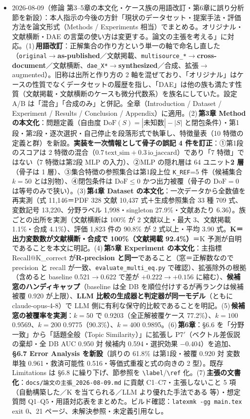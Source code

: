 \documentclass[11pt,a4paper]{jsarticle}
\begin{document}
\begin{itemize}[nosep]
  \item 2026-08-09（修論 第3--5章の本文化・ケース族の用語改訂・第6章に誤り分析節を新設）：本人指示の今後の方針「現状のデータセット・提案手法・評価方法を論文形式（Methods / Experiments 相当）でまとめる。オリジナル・文献横断・DAE の言葉の使い方は変更する。論文の主張を考える」に対応。(1)\,\textbf{用語改訂}：正解集合の作り方という単一の軸で命名し直した（\texttt{original}$\to$\textbf{as-published}／文献掲載、\texttt{multisource\_*}$\to$\textbf{cross-document}／文献横断、\texttt{dae\_X*}$\to$\textbf{synthesized}／合成、拡張$\to$augmented）。旧称は出所と作り方の 2 軸を混ぜており、「オリジナル」はケースの性質でなくデータセットの履歴を指し、「DAE」は他の族も満たす性質（文献掲載・文献横断のケースも微分代数系）を族名にしていた。設定 A/B は「混合」「合成のみ」と併記。全章（Introduction / Dataset / Experiment / Results / Conclusion / Appendix）に適用。(2)\,\textbf{第3章 Method の本文化}：問題定義（自由度 $\mathrm{DoF}(S)=|\text{未知数}|-|S|$ と閉包条件）・第1段・第2段・逐次選択・自己停止を段落形式で執筆し、特徴量表（10 特徴の定義と群）を新設。\textbf{実装を一次情報として骨子の誤記 4 件を訂正}：①第1段のスコアは 2 特徴の混合（$0.7\,\text{text\_sim}+0.3\,\text{io\_jaccard}$）であり「7 特徴」ではない（7 特徴は第2段 MLP の入力）、②MLP の隠れ層は 64 ユニット\textbf{2 層}（骨子は 1 層）、③集合特徴の参照集合は第1段上位 \texttt{K\_REF}=5 件（候補集合 $k=50$ とは別物）、④閉包条件は $\mathrm{DoF}\le 0$ かつ出力被覆（骨子の $\mathrm{DoF}=0$ は等号のみで狭い）。(3)\,\textbf{第4章 Dataset の本文化}：一次データから全数値を再実測（式 11,146＝PDF 328 文献 10,437 式＋生成参照集合 33 種 709 式、変数記号 13,220、分野ラベル 1,998・singleton 27.9\%・文献あたり 6.36）。族ごとの出所を実測（文献横断は 100\% が 2 文献以上・最大 3、文献掲載 1.1\%・合成 4.1\%）、評価 1,823 件の 90.8\% が 2 式以上・平均 3.90 式。\textbf{K＝出力変数数が文献横断・合成で 100\%（文献掲載 92.4\%）}＝K 予測が自明であることを本文に明記。(4)\,\textbf{第5章 Experiment の本文化}：主指標 Recall@K\_correct が\textbf{R-precision と同一}であること（窓＝正解数なので precision と recall が一致、\texttt{evaluate\_multi\_eq.py} で確認）、拡張除外の根拠（含めると baseline 0.521$\to$0.622 で差が $+0.222\to+0.156$ に縮む）、\textbf{候補窓のハンディキャップ}（baseline は全 DB を順位付けするが再ランクは候補被覆 0.920 が上限）、\textbf{LLM 比較の生成器と判定器が同一モデル}（ともに claude-opus-4-8）で LLM 側に有利な保守的比較であることを明記。(5)\,\textbf{候補窓の被覆率を実測}：$k=50$ で 0.9203（全正解被覆ケース 77.2\%）、$k=100$ 0.9569、$k=200$ 0.9775（90.3\%）、$k=400$ 0.9895。(6)\,\textbf{第6章}：§6.6 を「分野一致」から「話題全般（Topic Similarity）」に拡張し P7$'$（ベクトル差仮説の棄却・全 DB AUC 0.950 対 候補内 0.594・選択効果 $-0.404$）を追加、\textbf{§6.7 Error Analysis を新設}（誤りの 61.8\% は第1段・被覆 0.920 対 変数単独 0.961・救済可能性 0.516・等価式重複と式の向きの 2 型）。既存 Limitations は §6.8 に繰り下げ、節参照を \texttt{\textbackslash label}/\texttt{\textbackslash ref} 化。(7)\,\textbf{主張の文書化}：\texttt{docs/論文の主張\_2026-08-09.md} に貢献 C1--C7・主張しないこと 5 項（自動構築した／K を当てられる／LLM より優れた手法である 等）・想定質問 Q1--Q5・用語対応表をまとめた。ビルド確認：\texttt{latexmk -gg main.tex} exit 0、21 ページ、未解決参照・未定義引用なし。

\end{itemize}
\end{document}
